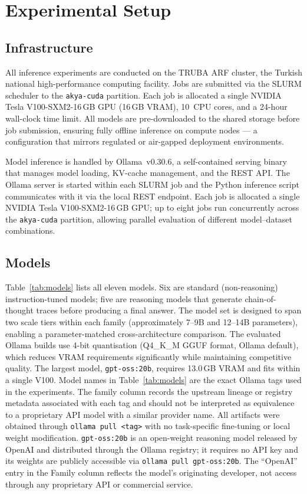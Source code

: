 \documentclass[a4paper,fleqn]{cas-dc}
\begin{document}
\section{Experimental Setup}
\label{sec:setup}

\subsection{Infrastructure}

All inference experiments are conducted on the TRUBA ARF cluster,
the Turkish national high-performance computing facility. Jobs are
submitted via the SLURM scheduler to the \texttt{akya-cuda} partition.
Each job is allocated a single NVIDIA Tesla V100-SXM2-16\,GB GPU
(16\,GB VRAM), 10~CPU cores, and a 24-hour wall-clock time limit.
All models are pre-downloaded to the shared storage before job submission,
ensuring fully offline inference on compute nodes --- a configuration
that mirrors regulated or air-gapped deployment environments.

Model inference is handled by Ollama~v0.30.6, a self-contained
serving binary that manages model loading, KV-cache management,
and the REST API. The Ollama server is started within each SLURM
job and the Python inference script communicates with it via
the local REST endpoint. Each job is allocated a single NVIDIA
Tesla V100-SXM2-16\,GB GPU; up to eight jobs run concurrently
across the \texttt{akya-cuda} partition, allowing parallel
evaluation of different model--dataset combinations.

\subsection{Models}

Table~\ref{tab:models} lists all eleven models. Six are standard
(non-reasoning) instruction-tuned models; five are reasoning models
that generate chain-of-thought traces before producing a final answer.
The model set is designed to span two scale tiers within each family
(approximately 7--9B and 12--14B parameters), enabling a parameter-matched
cross-architecture comparison. The evaluated Ollama builds use 4-bit
quantisation (Q4\_K\_M GGUF format, Ollama default), which reduces
VRAM requirements significantly while maintaining competitive quality.
The largest model, \texttt{gpt-oss:20b}, requires 13.0\,GB VRAM and
fits within a single V100.
Model names in Table~\ref{tab:models} are the exact Ollama tags used
in the experiments. The family column records the upstream lineage or
registry metadata associated with each tag and should not be interpreted
as equivalence to a proprietary API model with a similar provider name.
All artifacts were obtained through \texttt{ollama pull <tag>} with no
task-specific fine-tuning or local weight modification.
\texttt{gpt-oss:20b} is an open-weight reasoning model released by
OpenAI and distributed through the Ollama registry; it requires no API
key and its weights are publicly accessible via
\texttt{ollama pull gpt-oss:20b}.
The ``OpenAI'' entry in the Family column reflects the model's
originating developer, not access through any proprietary API or
commercial service.
\end{document}
